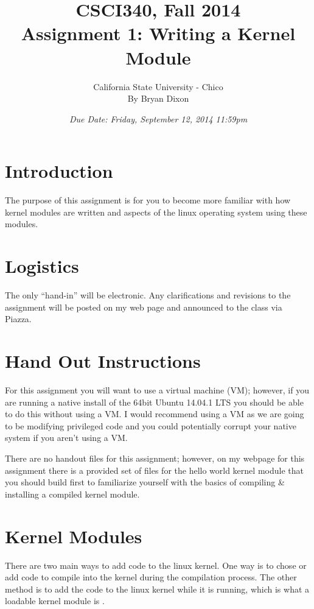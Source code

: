 \documentclass[11pt]{article}
\begin{document}
\title{CSCI340, Fall 2014\\
Assignment 1: Writing a Kernel Module
}

\author{California State University - Chico\\
  By Bryan Dixon\\
}
\date{\emph{Due Date: Friday, September 12, 2014 11:59pm}}


\maketitle

\section*{Introduction}
The purpose of this assignment is for you to become more familiar with how kernel modules are written and aspects of the linux operating system using these modules. 

\section*{Logistics}

The only ``hand-in'' will be electronic.  Any clarifications and revisions to the assignment will
be posted on my web page and announced to the class via Piazza.

\section*{Hand Out Instructions}

For this assignment you will want to use a virtual machine (VM); however, if you are running a native install of the 64bit Ubuntu 14.04.1 LTS you should be able to do this without using a VM. I would recommend using a VM as we are going to be modifying privileged code and you could potentially corrupt your native system if you aren't using a VM. 

There are no handout files for this assignment; however, on my webpage for this assignment there is a provided set of files for the hello world kernel module that you should build first to familiarize yourself with the basics of compiling \& installing a compiled kernel module. 


\section*{Kernel Modules}

There are two main ways to add code to the linux kernel. One way is to chose or add code to compile into the kernel during the compilation process. The other method is to add the code to the linux kernel while it is running, which is what a loadable kernel module is \cite{tldp}.
\end{document}
